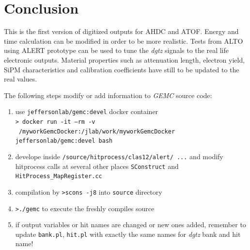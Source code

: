 \section{Conclusion}
This is the first version of digitized outputs for AHDC and ATOF. Energy and time calculation can be modified in order to be more realistic. Tests from ALTO using ALERT prototype can be used to tune the \textsl{dgtz} signals to the real life electronic outputs. Material properties such as attenuation length, electron yield, SiPM characteristics and calibration coefficients have still to be updated to the real values.

The following steps modify or add information to \textit{GEMC} source code:
\begin{enumerate}
	\item use \texttt{jeffersonlab/gemc:devel} docker container \\
		\texttt{> docker run -it --rm -v ~/myworkGemcDocker:/jlab/work/myworkGemcDocker \\ jeffersonlab/gemc:devel bash}  
	\item develope inside \texttt{/source/hitprocess/clas12/alert/ ...} and modify hitprocess calls at several other places \texttt{SConstruct} and \texttt{HitProcess\_MapRegister.cc}
	\item compilation by \texttt{>scons -j8} into  \texttt{source} directory
	\item \texttt{>./gemc} to execute the freshly compiles source
	\item if output variables or hit names are changed or new ones added, remember to update \texttt{bank.pl}, \texttt{hit.pl} with exactly the same names for \textsl{dgtz} bank and hit name!
\end{enumerate} 

